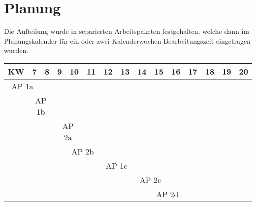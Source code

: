 \section{Planung}
Die Aufteilung wurde in separierten Arbeitspaketen festgehalten, welche dann im Planungskalender für ein oder zwei Kalenderwochen Bearbeitungszeit eingetragen wurden.\\
\begin{tabularx}{\linewidth}{|X|X|X|X|X|X|X|X|X|X|X|X|X|X|X|}
	\hline
	KW & 7 & 8 & 9 & 10 & 11 & 12 & 13 & 14 & 15 & 16 & 17 & 18 & 19 & 20\\\hline
	\multicolumn{2}{c}{\cellcolor{blue!25}AP 1a} &&&&&&&&&&&&&\\\hline
	& \multicolumn{2}{c}{\cellcolor{blue!25}AP 1b} &&&&&&&&&&&&\\\hline
	&&& \multicolumn{2}{c}{\cellcolor{blue!25}AP 2a} &&&&&&&&&&\\\hline
	&&&& \multicolumn{2}{c}{\cellcolor{blue!25}AP 2b} &&&&&&&&&\\\hline
	&&&&&& \multicolumn{2}{c}{\cellcolor{blue!25}AP 1c} &&&&&&&\\\hline
	&&&&&&&& \multicolumn{2}{c}{\cellcolor{blue!25}AP 2c} &&&&&\\\hline
	&&&&&&&&& \multicolumn{2}{c}{\cellcolor{blue!25}AP 2d} &&&&\\\hline
\end{tabularx}

